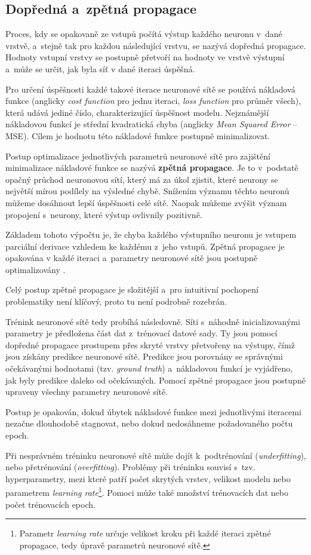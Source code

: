 \subsection{Dopředná a~zpětná propagace}
Proces, kdy se opakovaně ze vstupů počítá výstup každého neuronu v~dané vrstvě, a~stejně tak pro každou následující vrstvu, se nazývá dopředná propagace. Hodnoty vstupní vrstvy se postupně přetvoří na hodnoty ve vrstvě výstupní a~může se určit, jak byla síť v dané iteraci úspěšná.\par
Pro určení úspěšnosti každé takové iterace neuronové sítě se používá nákladová funkce (anglicky \textit{cost function} pro jednu iteraci, \textit{loss function} pro průměr všech), která udává jediné číslo, charakterizující úspěšnost modelu. Nejznámější nákladovou funkcí je střední kvadratická chyba (anglicky \textit{Mean Squared Error} -- MSE). Cílem je hodnotu této nákladové funkce postupně minimalizovat.\par \medskip
Postup optimalizace jednotlivých parametrů neuronové sítě pro zajištění minimalizace nákladové funkce se nazývá \textbf{zpětná propagace}. Je to v~podstatě opačný průchod neuronovou sítí, který má za úkol zjistit, které neurony se největší mírou podílely na výsledné chybě. Snížením významu těchto neuronů můžeme dosáhnout lepší úspěšnosti celé sítě. Naopak můžeme zvýšit význam propojení s~neurony, které výstup ovlivnily pozitivně.\par
Základem tohoto výpočtu je, že chyba každého výstupního neuronu je vstupem parciální derivace vzhledem ke každému z~jeho vstupů. Zpětná propagace je opakována v každé iteraci a~parametry neuronové sítě jsou postupně optimalizovány \cite{neural_nets}.\par
Celý postup zpětné propagace je složitější a~pro intuitivní pochopení problematiky není klíčový, proto tu není podrobně rozebrán.\par
\medskip
Trénink neuronové sítě tedy probíhá následovně. Síti s~náhodně inicializovanými parametry je předložena část dat z~trénovací datové sady. Ty jsou pomocí dopředné propagace prostupem přes skryté vrstvy přetvořeny na výstupy, čímž jsou získány predikce neuronové sítě. Predikce jsou porovnány se správnými očekávanými hodnotami (tzv. \emph{ground truth}) a~nákladovou funkcí je vyjádřeno, jak byly predikce daleko od očekávaných. Pomocí zpětné propagace jsou postupně upraveny všechny parametry neuronové sítě.\par
Postup je opakován, dokud úbytek nákladové funkce mezi jednotlivými iteracemi nezačne dlouhodobě stagnovat, nebo dokud nedosáhneme požadovaného počtu epoch.\par
Při nesprávném tréninku neuronové sítě může dojít k~podtrénování (\textit{underfitting}), nebo přetrénování (\textit{overfitting}). Problémy při tréninku souvisí s~tzv. hyperparametry, mezi které patří počet skrytých vrstev, velikost modelu nebo parametrem \emph{learning rate}\footnote{Parametr \emph{learning rate} určuje velikost kroku při každé iteraci zpětné propagace, tedy úpravě parametrů neuronové sítě.}. Pomoci může také množství trénovacích dat nebo počet trénovacích epoch.

